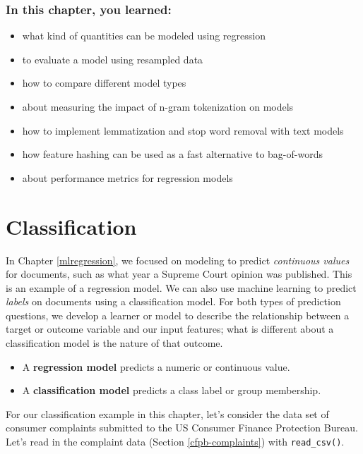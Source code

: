 \documentclass[
]{krantz}
\begin{document}
\hypertarget{in-this-chapter-you-learned-5}{%
\subsection{In this chapter, you learned:}\label{in-this-chapter-you-learned-5}}

\begin{itemize}
\item
  what kind of quantities can be modeled using regression
\item
  to evaluate a model using resampled data
\item
  how to compare different model types
\item
  about measuring the impact of n-gram tokenization on models
\item
  how to implement lemmatization and stop word removal with text models
\item
  how feature hashing can be used as a fast alternative to bag-of-words
\item
  about performance metrics for regression models
\end{itemize}

\hypertarget{mlclassification}{%
\chapter{Classification}\label{mlclassification}}

In Chapter \ref{mlregression}, we focused on modeling to predict \emph{continuous values} for documents, such as what year a Supreme Court opinion was published. This is an example of a regression model. We can also use machine learning to predict \emph{labels} on documents using a classification model. For both types of prediction questions, we develop a learner or model to describe the relationship between a target or outcome variable and our input features; what is different about a classification model is the nature of that outcome.

\begin{itemize}
\item
  A \textbf{regression model} predicts a numeric or continuous value.
\item
  A \textbf{classification model} predicts a class label or group membership.
\end{itemize}

For our classification example in this chapter, let's consider the data set of consumer complaints submitted to the US Consumer Finance Protection Bureau. Let's read in the complaint data (Section \ref{cfpb-complaints}) with \texttt{read\_csv()}.
\end{document}
